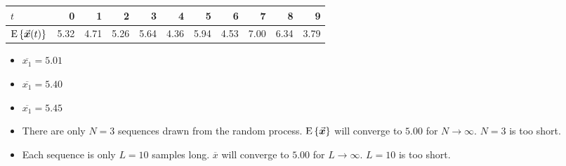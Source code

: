 \begin{solution}
	\begin{tasks}
		\task
		\begin{table}[H]
			\centering
			\begin{tabular}{|l|r|r|r|r|r|r|r|r|r|r|}
				\hline
				$t$ & 0 & 1 & 2 & 3 & 4 & 5 & 6 & 7 & 8 & 9 \\
				\hline
				\hline
				$\mathrm{E}\left\{\vec{\bm{x}}(t)\right\}$ & 5.32 & 4.71 & 5.26 & 5.64 & 4.36 & 5.94 & 4.53 & 7.00 & 6.34 & 3.79 \\
				\hline
			\end{tabular}
		\end{table}
	
		\task
		\begin{itemize}
			\item $\overline{x_1} = 5.01$
			\item $\overline{x_1} = 5.40$
			\item $\overline{x_1} = 5.45$
		\end{itemize}
	
		\task
		\begin{itemize}
			\item There are only $N = 3$ sequences drawn from the random process. $\mathrm{E}\left\{\vec{\bm{x}}\right\}$ will converge to $5.00$ for $N \rightarrow \infty$. $N = 3$ is too short.
			\item Each sequence is only $L = 10$ samples long. $\overline{x}$ will converge to $5.00$ for $L \rightarrow \infty$. $L = 10$ is too short.
		\end{itemize}
	\end{tasks}
\end{solution}

